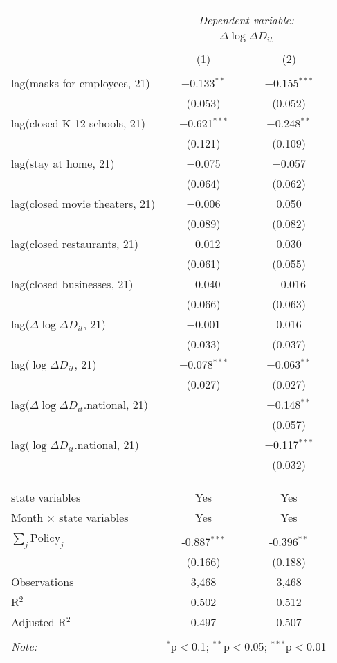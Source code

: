 \begin{tabular}{@{\extracolsep{1pt}}lcc} 
\\[-1.8ex]\hline 
\hline \\[-1.8ex] 
 & \multicolumn{2}{c}{\textit{Dependent variable:}} \\ 
\cline{2-3} 
 & \multicolumn{2}{c}{$\Delta \log \Delta D_{it}$} \\ 
\\[-1.8ex] & (1) & (2)\\ 
\hline \\[-1.8ex] 
 lag(masks for employees, 21) & $-$0.133$^{**}$ & $-$0.155$^{***}$ \\ 
  & (0.053) & (0.052) \\ 
  lag(closed K-12 schools, 21) & $-$0.621$^{***}$ & $-$0.248$^{**}$ \\ 
  & (0.121) & (0.109) \\ 
  lag(stay at home, 21) & $-$0.075 & $-$0.057 \\ 
  & (0.064) & (0.062) \\ 
  lag(closed movie theaters, 21) & $-$0.006 & 0.050 \\ 
  & (0.089) & (0.082) \\ 
  lag(closed restaurants, 21) & $-$0.012 & 0.030 \\ 
  & (0.061) & (0.055) \\ 
  lag(closed businesses, 21) & $-$0.040 & $-$0.016 \\ 
  & (0.066) & (0.063) \\ 
  lag($\Delta \log \Delta D_{it}$, 21) & $-$0.001 & 0.016 \\ 
  & (0.033) & (0.037) \\ 
  lag($\log \Delta D_{it}$, 21) & $-$0.078$^{***}$ & $-$0.063$^{**}$ \\ 
  & (0.027) & (0.027) \\ 
  lag($\Delta \log \Delta D_{it}$.national, 21) &  & $-$0.148$^{**}$ \\ 
  &  & (0.057) \\ 
  lag($\log \Delta D_{it}$.national, 21) &  & $-$0.117$^{***}$ \\ 
  &  & (0.032) \\ 
   &  &  \\ 
  &  &  \\ 
 \hline \\[-1.8ex] 
state variables & Yes & Yes \\ 
Month $\times$ state variables & Yes & Yes \\ 
\hline \\[-1.8ex] 
$\sum_j \mathrm{Policy}_j$ & -0.887$^{***}$ & -0.396$^{**}$ \\ 
 & (0.166) & (0.188) \\ 
Observations & 3,468 & 3,468 \\ 
R$^{2}$ & 0.502 & 0.512 \\ 
Adjusted R$^{2}$ & 0.497 & 0.507 \\ 
\hline 
\hline \\[-1.8ex] 
\textit{Note:}  & \multicolumn{2}{r}{$^{*}$p$<$0.1; $^{**}$p$<$0.05; $^{***}$p$<$0.01} \\ 
\end{tabular} 